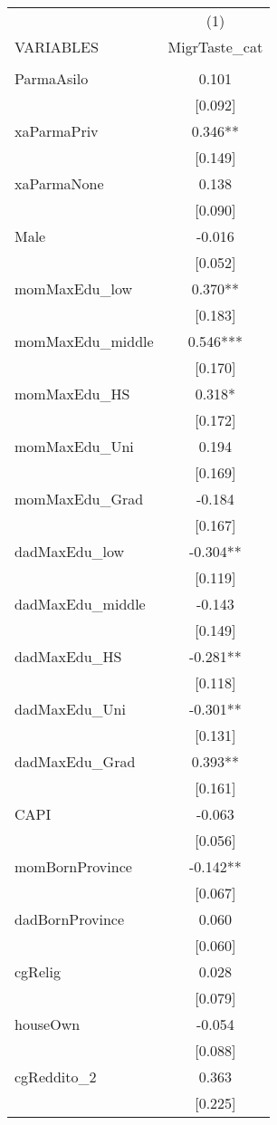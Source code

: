 \documentclass[]{article}
\begin{document}
\begin{tabular}{lc} \hline
 & (1) \\
VARIABLES & MigrTaste\_cat \\ \hline
 &  \\
ParmaAsilo & 0.101 \\
 & [0.092] \\
xaParmaPriv & 0.346** \\
 & [0.149] \\
xaParmaNone & 0.138 \\
 & [0.090] \\
Male & -0.016 \\
 & [0.052] \\
momMaxEdu\_low & 0.370** \\
 & [0.183] \\
momMaxEdu\_middle & 0.546*** \\
 & [0.170] \\
momMaxEdu\_HS & 0.318* \\
 & [0.172] \\
momMaxEdu\_Uni & 0.194 \\
 & [0.169] \\
momMaxEdu\_Grad & -0.184 \\
 & [0.167] \\
dadMaxEdu\_low & -0.304** \\
 & [0.119] \\
dadMaxEdu\_middle & -0.143 \\
 & [0.149] \\
dadMaxEdu\_HS & -0.281** \\
 & [0.118] \\
dadMaxEdu\_Uni & -0.301** \\
 & [0.131] \\
dadMaxEdu\_Grad & 0.393** \\
 & [0.161] \\
CAPI & -0.063 \\
 & [0.056] \\
momBornProvince & -0.142** \\
 & [0.067] \\
dadBornProvince & 0.060 \\
 & [0.060] \\
cgRelig & 0.028 \\
 & [0.079] \\
houseOwn & -0.054 \\
 & [0.088] \\
cgReddito\_2 & 0.363 \\
 & [0.225] \\

\end{tabular}
\end{document}
